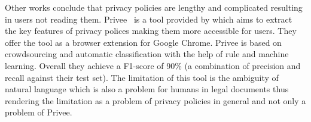Other works conclude that privacy policies are lengthy and complicated resulting in users not reading them.
Privee~\cite{zimmeck2014privee} is a tool provided by
\citeauthor{zimmeck2014privee} which aims to extract the key features of privacy polices making them more
accessible for users. They offer the tool as a browser extension for Google Chrome. Privee is based on crowdsourcing and
automatic classification with the help of rule and machine learning. Overall they achieve a F1-score of 90\% (a
combination of precision and recall against their test set).
The limitation of this tool is the ambiguity of natural language which is also a problem for humans in legal documents thus
rendering the limitation as a problem of privacy policies in general and not only a problem of Privee.

